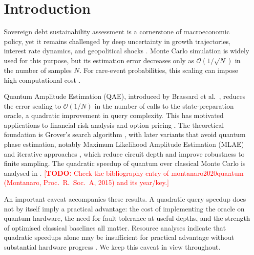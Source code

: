 \documentclass[pdflatex,sn-mathphys-num]{sn-jnl}%
\newcommand{\todo}[1]{\textcolor{red}{[\textbf{TODO:} #1]}}
\theoremstyle{thmstyleone}%
\theoremstyle{thmstyletwo}%
\theoremstyle{thmstylethree}%
\begin{document}

\maketitle

\section{Introduction}\label{sec1}

Sovereign debt sustainability assessment is a cornerstone of macroeconomic policy, yet it remains challenged by deep uncertainty in growth trajectories, interest rate dynamics, and geopolitical shocks \cite{imf2023fiscal, BIS2022debt}. Monte Carlo simulation is widely used for this purpose, but its estimation error decreases only as $\mathcal{O}(1/\sqrt{N})$ in the number of samples $N$. For rare-event probabilities, this scaling can impose high computational cost \cite{glasserman2004montecarlo}.

Quantum Amplitude Estimation (QAE), introduced by Brassard et al.\ \cite{brassard2002quantum}, reduces the error scaling to $\mathcal{O}(1/N)$ in the number of calls to the state-preparation oracle, a quadratic improvement in query complexity. This has motivated applications to financial risk analysis \cite{woerner2019quantum, egger2020credit} and option pricing \cite{stamatopoulos2020option}. The theoretical foundation is Grover's search algorithm \cite{grover1996fast}, with later variants that avoid quantum phase estimation, notably Maximum Likelihood Amplitude Estimation (MLAE) \cite{suzuki2020amplitude} and iterative approaches \cite{grinko2021iterative}, which reduce circuit depth and improve robustness to finite sampling. The quadratic speedup of quantum over classical Monte Carlo is analysed in \cite{montanaro2020quantum}. \todo{Check the bibliography entry of montanaro2020quantum (Montanaro, Proc.\ R.\ Soc.\ A, 2015) and its year/key.}

An important caveat accompanies these results. A quadratic query speedup does not by itself imply a practical advantage: the cost of implementing the oracle on quantum hardware, the need for fault tolerance at useful depths, and the strength of optimised classical baselines all matter. Resource analyses indicate that quadratic speedups alone may be insufficient for practical advantage without substantial hardware progress \cite{babbush2021focus, chakrabarti2021threshold}. We keep this caveat in view throughout.
\end{document}
